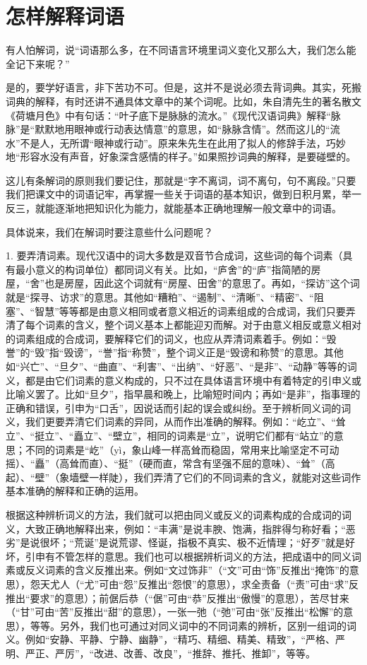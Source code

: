 \section{怎样解释词语}

有人怕解词，说“词语那么多，在不同语言环境里词义变化又那么大，我们怎么能全记下来呢？”

是的，要学好语言，非下苦功不可。但是，这并不是说必须去背词典。其实，死搬词典的解释，有时还讲不通具体文章中的某个词呢。比如，朱自清先生的著名散文《荷塘月色》中有句话：“叶子底下是脉脉的流水。”《现代汉语词典》解释“脉脉”是“默默地用眼神或行动表达情意”的意思，如“脉脉含情”。然而这儿的“流水”不是人，无所谓“眼神或行动”。原来朱先生在此用了拟人的修辞手法，巧妙地“形容水没有声音，好象深含感情的样子。”如果照抄词典的解释，是要碰壁的。

这儿有条解词的原则我们要记住，那就是“字不离词，词不离句，句不离段。”只要我们把课文中的词语记牢，再掌握一些关于词语的基本知识，做到日积月累，举一反三，就能逐渐地把知识化为能力，就能基本正确地理解一般文章中的词语。

具体说来，我们在解词时要注意些什么问题呢？

1. 要弄清词素。现代汉语中的词大多数是双音节合成词，这些词的每个词素（具有最小意义的构词单位）都同词义有关。比如，“庐舍”的“庐”指简陋的房屋，“舍”也是房屋，因此这个词就有“房屋、田舍”的意思了。再如，“探访”这个词就是“探寻、访求”的意思。其他如“糟粕”、“遏制”、“清晰”、“精密”、“阻塞”、“智慧”等等都是由意义相同或者意义相近的词素组成的合成词，我们只要弄清了每个词素的含义，整个词义基本上都能迎刃而解。对于由意义相反或意义相对的词素组成的合成词，要解释它们的词义，也应从弄清词素着手。例如：“毁誉”的“毁”指“毁谤”，“誉”指“称赞”，整个词义正是“毁谤和称赞”的意思。其他如“兴亡”、“旦夕”、“曲直”、“利害”、“出纳”、“好恶”、“是非”、“动静”等等的词义，都是由它们词素的意义构成的，只不过在具体语言环境中有着特定的引申义或比喻义罢了。比如“旦夕”，指早晨和晚上，比喻短时间内；再如“是非”，指事理的正确和错误，引申为“口舌”，因说话而引起的误会或纠纷。至于辨析同义词的词义，我们更要弄清它们词素的异同，从而作出准确的解释。例如：“屹立”、“耸立”、“挺立”、“矗立”、“壁立”，相同的词素是“立”，说明它们都有“站立”的意思；不同的词素是“屹”（yì，象山峰一样高耸而稳固，常用来比喻坚定不可动摇）、“矗”（高耸而直）、“挺”（硬而直，常含有坚强不屈的意味）、“耸”（高起）、“壁”（象墙壁一样陡），我们弄清了它们的不同词素的含义，就能对这些词作基本准确的解释和正确的运用。

根据这种辨析词义的方法，我们就可以把由同义或反义的词素构成的合成词的词义，大致正确地解释出来，例如：“丰满”是说丰腴、饱满，指胖得匀称好看；“恶劣”是说很坏；“荒诞”是说荒谬、怪诞，指极不真实、极不近情理；“好歹”就是好坏，引申有不管怎样的意思。我们也可以根据辨析词义的方法，把成语中的同义词素或反义词素的含义反推出来。例如“文过饰非”（“文”可由“饰”反推出“掩饰”的意思），怨天尤人（“尤”可由“怨”反推出“怨恨”的意思），求全责备（“责”可由“求”反推出“要求”的意思）；前倨后恭（“倨”可由“恭”反推出“傲慢”的意思），苦尽甘来（“甘”可由“苦”反推出“甜”的意思），一张一弛（“弛”可由“张”反推出“松懈”的意思），等等。另外，我们也可通过对同义词中的不同词素的辨析，区别一组词的词义。例如“安静、平静、宁静、幽静”，“精巧、精细、精美、精致”，“严格、严明、严正、严厉”，“改进、改善、改良”，“推辞、推托、推卸”，等等。


